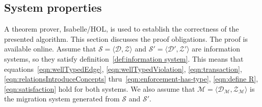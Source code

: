 \documentclass[runningheads]{llncs}
\newcommand{\pair}[2]{\langle{#1},{#2}\rangle}
\newcommand{\dataset}{\mathscr{D}}
\newcommand{\schema}{\mathscr{Z}}
\newcommand{\migrsys}{\mathscr{M}}
\newcommand{\infsys}{\mathscr{S}}
\begin{document}
\subsection{System properties}
\label{sct:Proof}
   A theorem prover, Isabelle/HOL, is used to establish the correctness of the presented algorithm.
   This section discusses the proof obligations. The proof is available online.
   Assume that $\infsys=\pair{\dataset}{\schema}$ and $\infsys'=\pair{\dataset'}{\schema'}$ are information systems, so they satisfy definition~\ref{def:information system}.
   This means that equations~\ref{eqn:wellTypedEdge}, \ref{eqn:wellTypedViolation}, \ref{eqn:transaction}, \ref{eqn:relationsIntroduceConcepts} thru~\ref{eqn:enforcement-has-type}, \ref{eqn:define R}, \ref{eqn:satisfaction} hold for both systems.
   We also assume that $\migrsys=\pair{\dataset_\migrsys}{\schema_\migrsys}$ is the migration system generated from $\infsys$ and $\infsys'$.
\end{document}

